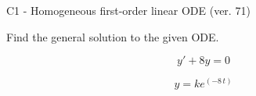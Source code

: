 \begin{exercise}
  \begin{exerciseTitle}C1 - Homogeneous first-order linear ODE (ver. 71)\end{exerciseTitle}
  \begin{exerciseStatement}
    
Find the general solution to the given ODE.

    
\[y'+8y=0\]

  \end{exerciseStatement}
  \begin{exerciseAnswer}
    
\[y= k e^{\left(-8 \, t\right)}\]

  \end{exerciseAnswer}
\end{exercise}